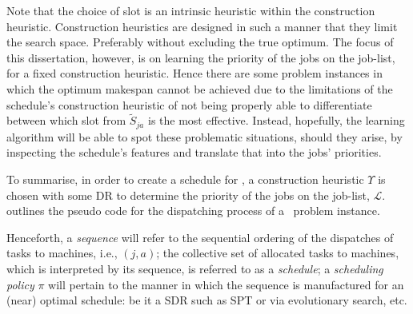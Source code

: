Note that the choice of slot is an intrinsic heuristic within the construction heuristic.
Construction heuristics are designed in such a manner that they limit the 
search space. Preferably without excluding the true optimum. The focus of this 
dissertation, however, is on learning the priority of the jobs on the job-list, 
for a fixed construction heuristic. Hence there are some problem instances in 
which the optimum makespan cannot be achieved due to the limitations of the 
schedule's construction heuristic of not being properly able to differentiate 
between which slot from $\tilde{S}_{ja}$ is the most effective. Instead, 
hopefully, the learning algorithm will be able to spot these problematic 
situations, should they arise, by inspecting the schedule's features and 
translate that into the jobs' priorities.

To summarise, in order to create a schedule for \JSP, a construction heuristic 
$\Upsilon$ is chosen with some DR to determine the priority of the jobs on the 
job-list, $\mathcal{L}$. 
 outlines the pseudo code for the 
dispatching process of a \JSP\ problem instance.



Henceforth, a \emph{sequence} will refer to the sequential ordering of the 
dispatches of tasks to machines, i.e., $(j,a)$; the collective set of allocated 
tasks to machines, which is interpreted by its sequence, is referred to as a 
\emph{schedule}; a \emph{scheduling policy} $\pi$ will pertain to the manner in 
which the sequence is manufactured for an (near) optimal schedule: be it a SDR 
such as SPT or via evolutionary search, etc. 

